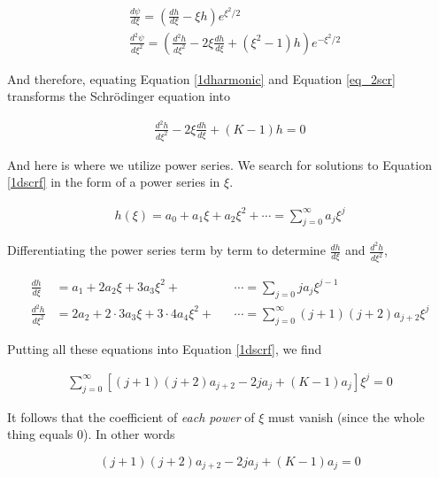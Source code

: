 \begin{align} \label{}
  &\frac{d \psi}{d \xi} = \left( \frac{d h}{d \xi} -\xi h \right) e^{\xi^2 / 2}
  \\
  &\frac{d^2 \psi}{d \xi^2} = \left( \frac{d^2 h}{d \xi^2} - 2\xi \frac{d h}{d
  \xi}  + (\xi^2 - 1)h \right) e^{-\xi^2 / 2} \label{eq_2scr}
\end{align}\vspace{3px}

And therefore, equating Equation \ref{1dharmonic} and Equation \ref{eq_2scr}
transforms the Schr\"odinger equation into 

\begin{align} \label{1dscrf}
  \frac{d^2 h}{d \xi^2} - 2\xi \frac{d h}{d \xi}  + (K-1)h = 0
\end{align}\vspace{3px}

And here is where we utilize power series. We search for solutions to Equation
\ref{1dscrf} in the form of a power series in $\xi$. 

\begin{align} \label{}
  h(\xi) = a_0 + a_1\xi + a_2\xi^2 + \cdots = \sum_{j=0}^\infty a_j \xi^j
\end{align}\vspace{3px}

Differentiating the power series term by term to determine $ \frac{d h}{d \xi}
$ and $ \frac{d^2 h}{d \xi^2} $, 

\begin{align} \label{xidiffeqs}
  \frac{d h}{d \xi} &= a_1 + 2a_2\xi + 3a_3\xi^2 + &&\cdots = \sum_{j=0} ja_j
  \xi^{j-1} \\ 
  \frac{d^2 h}{d \xi^2} &= 2a_2 + 2 \cdot 3a_3\xi + 3 \cdot 4a_4\xi^2 + &&\cdots
  = \sum_{j=0}^\infty (j+1)(j+2)a_{j+2}\xi^j
\end{align}\vspace{3px}

Putting all these equations into Equation \ref{1dscrf}, we find

\begin{align} \label{ps}
  \sum_{j=0}^\infty [(j+1)(j+2)a_{j+2} - 2ja_j + (K-1)a_j]\xi^j =  0
\end{align}\vspace{3px}

It follows that the coefficient of \textit{each power} of $\xi$ must vanish
(since the whole thing equals 0). In other words

\[
  (j+1)(j+2) a_{j+2} - 2ja_j + (K-1)a_j = 0
\] \vspace{3px}

